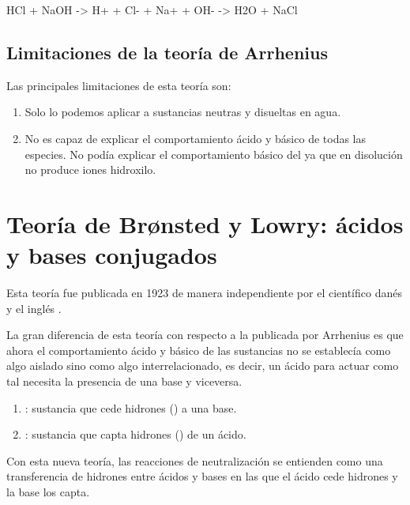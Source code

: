     \begin{reaction*}
        HCl + NaOH -> {\color{blue} H+} + \color{red} Cl- + Na+ + {\color{blue} OH-} \color{black} -> \color{blue} H2O \color{black} + \color{red} NaCl
    \end{reaction*}

    \subsection{Limitaciones de la teoría de Arrhenius}

    Las principales limitaciones de esta teoría son:
    \begin{enumerate}[label=\numberballmDarkTeal]
        \item Solo lo podemos aplicar a sustancias neutras y disueltas en agua.
        \item No es capaz de explicar el comportamiento ácido y básico de todas las especies. No podía explicar el comportamiento básico del  ya que en disolución no produce iones hidroxilo.
    \end{enumerate}


    \section{Teoría de Br\o{}nsted y Lowry: ácidos y bases conjugados}
    Esta teoría fue publicada en \num{1923} de manera independiente por el científico danés  y el inglés .

    La gran diferencia de esta teoría con respecto a la publicada por Arrhenius es que ahora el comportamiento ácido y básico de las sustancias no se establecía como algo aislado sino como algo interrelacionado, es decir, un ácido para actuar como tal necesita la presencia de una base y viceversa.

    \begin{enumerate}[label=\numberballmDarkTeal]
        \item {}: sustancia que cede hidrones () a una base.
        \item {}: sustancia que capta hidrones () de un ácido.
    \end{enumerate}

    Con esta nueva teoría, las reacciones de neutralización se entienden como una transferencia de hidrones entre ácidos y bases en las que el ácido cede hidrones y la base los capta.

